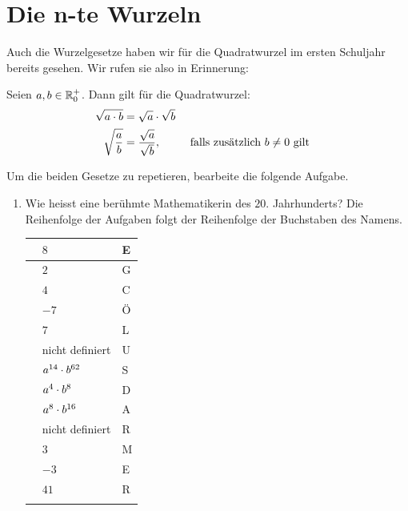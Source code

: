 \documentclass[11pt,oneside]{article}
\begin{document}
\newpage
\section{Die n-te Wurzeln}
	Auch die Wurzelgesetze haben wir für die Quadratwurzel im ersten Schuljahr bereits gesehen. Wir rufen sie also in Erinnerung:
	\begin{satz}[Wurzegesetze]
		Seien $a,b\in\mathbb{R}_0^+$. Dann gilt für die Quadratwurzel:
		\begin{align*}
			\sqrt{a\cdot b}&=\sqrt{a}\cdot\sqrt{b}\\
			\sqrt{\frac{a}{b}}&=\frac{\sqrt{a}}{\sqrt{b}},&& \text{ falls zusätzlich } b\neq 0 \text{ gilt}
		\end{align*}
	\end{satz}
	Um die beiden Gesetze zu repetieren, bearbeite die folgende Aufgabe.
	\begin{aufgabe}
		\begin{enumerate}
			\item Wie heisst eine berühmte Mathematikerin des $20.$ Jahrhunderts? Die Reihenfolge der Aufgaben folgt der Reihenfolge der Buchstaben des Namens.
			\begingroup
			\renewcommand{\arraystretch}{1.2}
			\begin{table}[H]
				\centering
				\begin{tabularx}{0.8\textwidth}{| >{\raggedright\arraybackslash}X | >{\centering\arraybackslash}X | >{\centering\arraybackslash}X | }\hline
					\multirow{3}{4em}{$\sqrt{\sqrt{256}}=$} & $8$ & E \\\cline{2-3}
					& $2$ & G \\\cline{2-3}
					& $4$ & C \\\hline\hline
					\multirow{3}{4em}{$\sqrt{(-7)^2}=$} & $-7$ & Ö \\\cline{2-3}
					& $7$ & L \\\cline{2-3}
					& nicht definiert & U \\\hline\hline
					\multirow{3}{4em}{$\sqrt{a^{16}\*b^{64}}=$} & $a^{14}\cdot b^{62}$ & S \\\cline{2-3}
					& $a^4\cdot b^8$ & D \\\cline{2-3}
					& $a^8\cdot b^{16}$ & A \\\hline\hline
					\multirow{3}{4em}{$\sqrt{-9}=$} & nicht definiert & R \\\cline{2-3}
					& $3$ & M \\\cline{2-3}
					& $-3$ & E \\\hline\hline
					\multirow{3}{4em}{$\sqrt{20^2+21^2}=$} & $41$ & R \\\cline{2-3}

\end{tabularx}
\end{table}
\end{enumerate}
\end{aufgabe}
\end{document}
